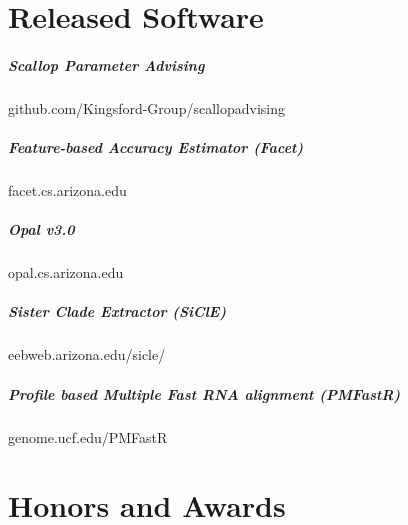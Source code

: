\documentclass[10pt,letterpaper]{article}
\begin{document}






\section*{Released Software}
\subparagraph{Scallop Parameter Advising}						github.com/Kingsford-Group/scallopadvising
\subparagraph{Feature-based Accuracy Estimator (Facet)} 			facet.cs.arizona.edu
\subparagraph{Opal v3.0}										opal.cs.arizona.edu 
\subparagraph{Sister Clade Extractor (SiClE)}						eebweb.arizona.edu/sicle/
\subparagraph{Profile based Multiple Fast RNA alignment (PMFastR)}	genome.ucf.edu/PMFastR 

\section*{Honors and Awards}
\end{document}
